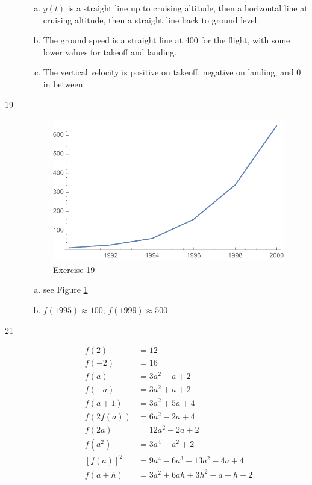 \documentclass[letterpaper, landscape]{exam}
\begin{document}
\begin{description}
\begin{enumerate}[(a)]
          \item $y(t)$ is a straight line up to cruising altitude, then a
            horizontal line at cruising altitude, then a straight line back to
            ground level.

          \item The ground speed is a straight line at 400 for the flight, with
            some lower values for takeoff and landing.

          \item The vertical velocity is positive on takeoff, negative on
            landing, and 0 in between.
        \end{enumerate}

      \item[19] 
        \begin{figure}[H]
          \centering
          \includegraphics[scale = 0.6]{ex19.pdf}
          \caption{Exercise 19}
          \label{fig:ex19}
        \end{figure}

        \begin{enumerate}[(a)]
          \item see Figure \ref{fig:ex19}
          \item $f(1995) \approx 100$; $f(1999) \approx 500$
        \end{enumerate}

      \item[21]
        \begin{align*}
          f(2)          &= 12 \\
          f(-2)         &= 16 \\
          f(a)          &= 3a^2 - a + 2 \\
          f(-a)         &= 3a^2 + a + 2 \\
          f(a + 1)      &= 3a^2 + 5a + 4 \\
          f(2 f(a))     &= 6a^2 - 2a + 4 \\
          f(2a)      &= 12a^2 - 2a + 2 \\
          f(a^2)     &= 3a^4 - a^2 + 2 \\
          [ f(a) ]^2 &= 9a^4 - 6a^3 + 13a^2 - 4a +  4 \\
          f(a + h)   &= 3a^2 + 6ah + 3h^2 - a - h + 2 \\
        \end{align*}


\end{description}
\end{document}
